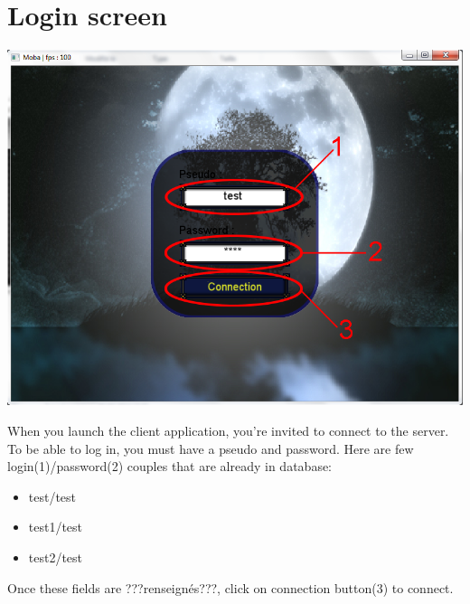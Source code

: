 \documentclass{scrreprt}
\begin{document}
		  \section{Login screen}
		  \begin{center}
		  \includegraphics[scale=0.4]{connection_screen.png}
		  \end{center}
		  When you launch the client application, you're invited to connect to the server. To be able to log in, you must have a pseudo and password. Here are few login(1)/password(2) couples that are already in database:
		  \begin{itemize}
		  \item{test/test}
		  \item{test1/test}
		  \item{test2/test}
		  \end{itemize}

		  Once these fields are ???renseignés???, click on connection button(3) to connect.
		  
\end{document}
